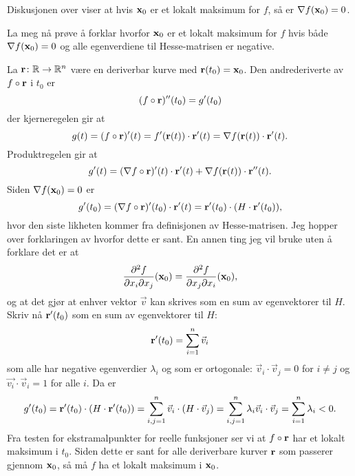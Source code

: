 Diskusjonen over viser at hvis $\mathbf{x}_0$ er et lokalt maksimum for $f$, så er $\nabla f(\mathbf{x}_0) = 0$.

La meg nå prøve å forklar hvorfor $\mathbf{x}_0$ er et lokalt maksimum for $f$ hvis både $\nabla f(\mathbf{x}_0) = 0$
og alle egenverdiene til Hesse-matrisen er negative.

La $\mathbf{r} \colon \mathbb{R} \to \mathbb{R}^n$ være en deriverbar kurve med $\mathbf{r}(t_0) = \mathbf{x}_0$. 
Den andrederiverte av $f \circ \mathbf{r}$ i $t_0$ er
$$(f \circ \mathbf{r})''(t_0) = g'(t_0)$$
der kjerneregelen gir at
$$g(t) = (f \circ \mathbf{r})'(t) = f'(\mathbf{r}(t)) \cdot \mathbf{r}'(t) =
\nabla f(\mathbf{r}(t)) \cdot \mathbf{r}'(t).$$
Produktregelen gir at
$$g'(t) = (\nabla f \circ \mathbf{r})'(t) \cdot \mathbf{r}'(t) + \nabla f(\mathbf{r}(t)) \cdot \mathbf{r}''(t).$$
Siden $\nabla f(\mathbf{x}_0) = 0$ er
$$g'(t_0) = (\nabla f \circ \mathbf{r})'(t_0) \cdot \mathbf{r}'(t) = \mathbf{r}'(t_0) \cdot(H \cdot \mathbf{r}'(t_0)),$$
hvor den siste likheten kommer fra definisjonen av Hesse-matrisen.
Jeg hopper over forklaringen av hvorfor dette er sant.
En annen ting jeg vil bruke uten å forklare det er at 
$$\frac{\partial^2 f}{\partial x_i \partial x_j}(\mathbf{x}_0) = \frac{\partial^2 f}{\partial x_j \partial x_i}(\mathbf{x}_0),$$
og at det gjør at enhver vektor $\vec{v}$ kan skrives som
en sum av egenvektorer til $H$.
Skriv nå $\mathbf{r}'(t_0)$ som en sum av egenvektorer til $H$:
$$\mathbf{r}'(t_0) = \sum_{i=1}^n \vec{v}_i$$
som alle har negative egenverdier $\lambda_i$ og som er ortogonale: $\vec{v}_i \cdot \vec{v}_j = 0$ for $i \ne j$ 
og $\vec{v_i} \cdot \vec{v}_i = 1$ for alle $i$.
Da er
$$g'(t_0) = \mathbf{r}'(t_0) \cdot (H \cdot \mathbf{r}'(t_0)) = \sum_{i, j=1}^n
\vec{v}_i \cdot (H \cdot \vec{v}_j) = \sum_{i, j=1}^n \lambda_i \vec{v}_i \cdot
\vec{v}_j = \sum_{i=1}^n \lambda_i  < 0.$$
Fra testen for ekstramalpunkter for reelle funksjoner ser vi at $f \circ
\mathbf{r}$ har et lokalt maksimum i $t_0$.
Siden dette er sant for alle deriverbare kurver $\mathbf{r}$ som passerer gjennom
$\mathbf{x}_0$, så må $f$ ha et lokalt maksimum i $\mathbf{x}_0$.
